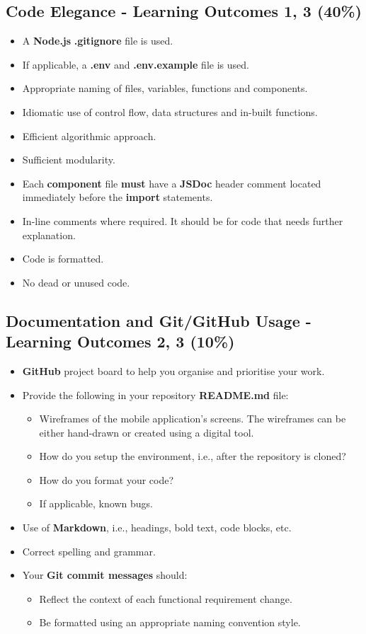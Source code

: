 \documentclass{article}
\begin{document}
\subsection*{Code Elegance - Learning Outcomes 1, 3 (40\%)}
\begin{itemize}
	\item A \textbf{Node.js} \textbf{.gitignore} file is used.
	\item If applicable, a \textbf{.env} and \textbf{.env.example} file is used.
  \item Appropriate naming of files, variables, functions and components.
	\item Idiomatic use of control flow, data structures and in-built functions.
  \item Efficient algorithmic approach.
  \item Sufficient modularity.
  \item Each \textbf{component} file \textbf{must} have a \textbf{JSDoc} header comment located immediately before the \textbf{import} statements.
\item In-line comments where required. It should be for code that needs further explanation.
  \item Code is formatted.
\item No dead or unused code. 
\end{itemize}

\subsection*{Documentation and Git/GitHub Usage - Learning Outcomes 2, 3 (10\%)}
\begin{itemize}
	\item \textbf{GitHub} project board to help you organise and prioritise your work. 
    \item Provide the following in your repository \textbf{README.md} file:
    \begin{itemize} 
      \item Wireframes of the mobile application's screens. The wireframes can be either hand-drawn or created using a digital tool.
	  \item How do you setup the environment, i.e., after the repository is cloned?
      \item How do you format your code?
      \item If applicable, known bugs.
    \end{itemize}
    \item Use of \textbf{Markdown}, i.e., headings, bold text, code blocks, etc.
    \item Correct spelling and grammar.
    \item Your \textbf{Git commit messages} should:
    \begin{itemize}
      \item Reflect the context of each functional requirement change.
      \item Be formatted using an appropriate naming convention style.
    \end{itemize}
\end{itemize}
\end{document}
